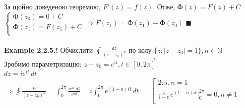 \documentclass[a4paper, 14pt]{extarticle}
\def\hugespace{\vspace{5mm} \\}
\begin{document}
	За щойно доведеною теоремою, $F'(z)=f(z)$. Отже, $\textrm{Ф}(z)=F(z)+C$\\
	$\begin{cases}
		\textrm{Ф}(z_0) = 0 + C\\
		\textrm{Ф}(z_1) = F(z_1) + C\\
	\end{cases} \Rightarrow F(z_1)=\textrm{Ф}(z_1)-\textrm{Ф}(z_0)$ $\blacksquare$\\
	\hugespace
	\textbf{Example 2.2.5.!} Обчислити $\displaystyle \oint \frac{dz}{(z-z_0)^n}$ по колу $\{z: |z-z_0|=1\}, n\in \mathbb{N}$\\
	Зробимо параметризацію: $\displaystyle z-z_0=e^{it},t \in \vec{[0,2\pi]}$\\
	$dz=ie^{it}\,dt$\\
	$\Rightarrow \displaystyle \oint \frac{dz}{(z-z_0)^n}= \int_0^{2\pi} \frac{ie^{it}\,dt}{e^{nit}}=i\int_0^{2\pi}e^{(1-n)it}\,dt =$
	$\left[ 
      \begin{gathered} 
        2 \pi i, n =1 \\ 
        \frac{1}{1-n}e^{(1-n)it} \Big|_0^{2\pi} = 0, n \neq 1 \\ 
      \end{gathered} 
\right.$
	\hugespace
	
\end{document}

